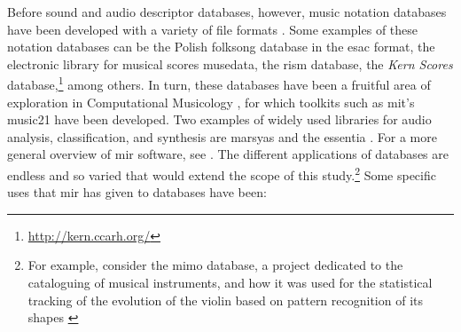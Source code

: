 Before sound and audio descriptor databases, however, music notation databases have been developed with a variety of file formats . Some examples of these notation databases can be the Polish folksong database in the \gls{esac} format, the electronic library for musical scores \gls{musedata}, the \gls{rism} database, the \textit{Kern Scores} database,\footnote{\url{http://kern.ccarh.org/}} among others. In turn, these databases have been a fruitful area of exploration in Computational Musicology \parencite{DBLP:conf/iciso/Yokl11}, for which toolkits such as \gls{mit}'s \gls{music21} have been developed. Two examples of widely used libraries for audio analysis, classification, and synthesis are \gls{marsyas} \parencite{tzanetakis_cook_2000} and the \gls{essentia} \parencite{DBLP:conf/ismir/BogdanovWGGHMRSZS13}. For a more general overview of \gls{mir} software, see \parencite{DBLP:conf/ismir/BogdanovWGGHMRSZS13}. The different applications of databases are endless and so varied that would extend the scope of this study.\footnote{For example, consider the \gls{mimo} database, a project dedicated to the cataloguing of musical instruments, and how it was used for the statistical tracking of the evolution of the violin based on pattern recognition of its shapes \parencite{2018arXiv180802848P}} Some specific uses that \gls{mir} has given to databases have been:

